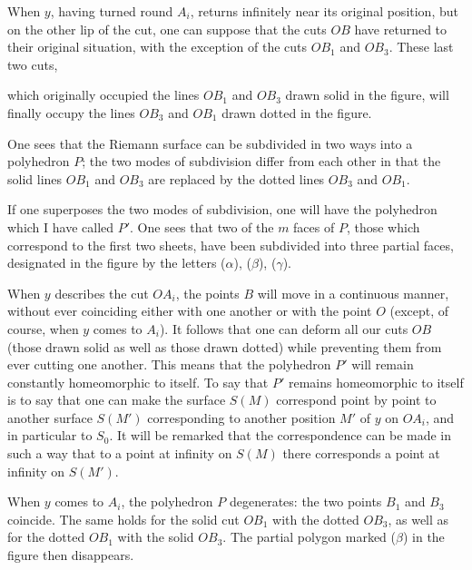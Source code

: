 \documentclass{article}
\begin{document}
When $y$, having turned round $A_{i}$, returns infinitely near its original position, but on the other lip of the cut, one can suppose that the cuts $OB$ have returned to their original situation, with the exception of the cuts $OB_{1}$ and $OB_{3}$. These last two cuts,

which originally occupied the lines $OB_{1}$ and $OB_{3}$ drawn solid in the figure, will finally occupy the lines $OB_{3}$ and $OB_{1}$ drawn dotted in the figure.

One sees that the Riemann surface can be subdivided in two
ways into a polyhedron $P$; the two modes of subdivision differ from each other in that the solid lines $OB_{1}$ and $OB_{3}$ are replaced by the dotted lines $OB_{3}$ and $OB_{1}$.

If one superposes the two modes of subdivision, one will have the polyhedron which I have called $P'$. One sees that two of the $m$ faces of $P$, those which correspond to the first two sheets, have been subdivided into three partial faces, designated in the figure by the letters ($\alpha$), ($\beta$), ($\gamma$).

When $y$ describes the cut $OA_{i}$, the points $B$ will move in a continuous manner, without ever coinciding either with one another or with the point $O$ (except, of course, when $y$ comes to $A_{i}$). It follows that one can deform all our cuts $OB$ (those drawn solid as well as those drawn dotted) while preventing them from ever cutting one another. This means that the polyhedron $P'$ will remain constantly homeomorphic to itself. To say that $P'$ remains homeomorphic to itself is to say that one can make the surface $S(M)$ correspond point by point to another surface $S(M')$ corresponding to another position $M'$ of $y$ on $OA_{i}$, and in particular to $S_{0}$. It will be remarked that the correspondence can be made in such a way that to a point at infinity on $S(M)$ there corresponds a point at infinity on $S(M')$.


When $y$ comes to $A_{i}$, the polyhedron $P$ degenerates: the two points $B_{1}$ and $B_{3}$ coincide. The same holds for the solid cut $OB_{1}$ with the dotted $OB_{3}$, as well as for the dotted $OB_{1}$ with the solid $OB_{3}$. The partial polygon marked ($\beta$) in the figure then disappears.
\end{document}
